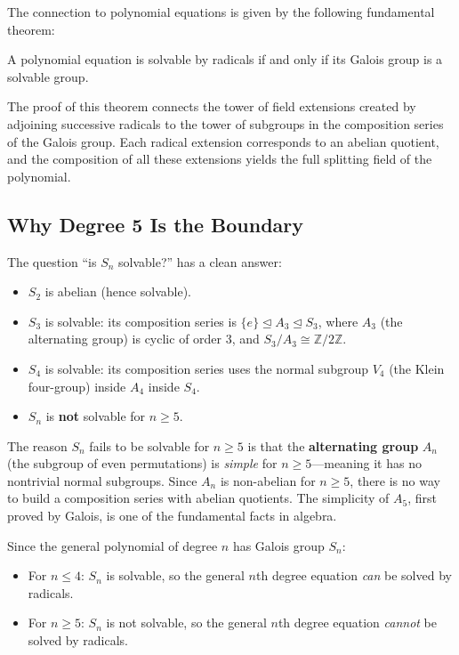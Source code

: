 The connection to polynomial equations is given by the following fundamental theorem:

\begin{theorem}[Galois]\label{thm:galois-solvable}
A polynomial equation is solvable by radicals if and only if its Galois group is a solvable group.
\end{theorem}

The proof of this theorem connects the tower of field extensions created by adjoining successive radicals to the tower of subgroups in the composition series of the Galois group. Each radical extension corresponds to an abelian quotient, and the composition of all these extensions yields the full splitting field of the polynomial.

\subsection{Why Degree 5 Is the Boundary}

The question ``is $S_n$ solvable?'' has a clean answer:

\begin{itemize}
    \item $S_2$ is abelian (hence solvable).
    \item $S_3$ is solvable: its composition series is $\{e\} \trianglelefteq A_3 \trianglelefteq S_3$, where $A_3$ (the alternating group) is cyclic of order 3, and $S_3/A_3 \cong \mathbb{Z}/2\mathbb{Z}$.
    \item $S_4$ is solvable: its composition series uses the normal subgroup $V_4$ (the Klein four-group) inside $A_4$ inside $S_4$.
    \item $S_n$ is \textbf{not} solvable for $n \geq 5$.
\end{itemize}

The reason $S_n$ fails to be solvable for $n \geq 5$ is that the \textbf{alternating group} $A_n$ (the subgroup of even permutations) is \emph{simple} for $n \geq 5$---meaning it has no nontrivial normal subgroups. Since $A_n$ is non-abelian for $n \geq 5$, there is no way to build a composition series with abelian quotients. The simplicity of $A_5$, first proved by Galois, is one of the fundamental facts in algebra.

Since the general polynomial of degree $n$ has Galois group $S_n$:
\begin{itemize}
    \item For $n \leq 4$: $S_n$ is solvable, so the general $n$th degree equation \emph{can} be solved by radicals.
    \item For $n \geq 5$: $S_n$ is not solvable, so the general $n$th degree equation \emph{cannot} be solved by radicals.
\end{itemize}

